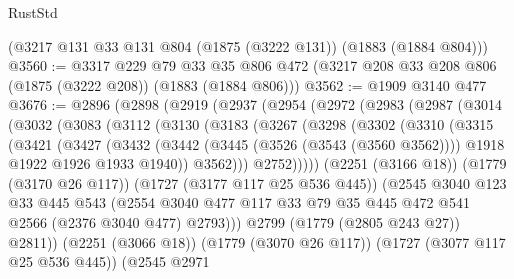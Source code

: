 \begin{lexlean}{RustStd}
\begin{coremodule}
    (@3217 @131 @33 @131 @804 (@1875 (@3222 @131)) (@1883 (@1884 @804)))
@3560 := @3317
    @229
    @79
    @33
    @35
    @806
    @472
    (@3217 @208 @33 @208 @806 (@1875 (@3222 @208)) (@1883 (@1884 @806)))
@3562 := @1909 @3140 @477
@3676 := @2896
    (@2898
      (@2919
        (@2937
          (@2954
            (@2972
              (@2983
                (@2987
                  (@3014
                    (@3032
                      (@3083
                        (@3112
                          (@3130
                            (@3183
                              (@3267
                                (@3298
                                  (@3302
                                    (@3310
                                      (@3315
                                        (@3421
                                          (@3427
                                            (@3432
                                              (@3442
                                                (@3445 (@3526 (@3543 (@3560 @3562))))
                                                @1918
                                                @1922
                                                @1926
                                                @1933
                                                @1940))
                                            @3562)))
                                      @2752)))))
                            (@2251 (@3166 @18))
                            (@1779 (@3170 @26 @117))
                            (@1727 (@3177 @117 @25 @536 @445))
                            (@2545
                              @3040
                              @123
                              @33
                              @445
                              @543
                              (@2554
                                @3040
                                @477
                                @117
                                @33
                                @79
                                @35
                                @445
                                @472
                                @541
                                @2566
                                (@2376 @3040 @477)
                                @2793)))
                          @2799
                          (@1779 (@2805 @243 @27))
                          @2811))
                      (@2251 (@3066 @18))
                      (@1779 (@3070 @26 @117))
                      (@1727 (@3077 @117 @25 @536 @445))
                      (@2545
                        @2971

\end{coremodule}
\end{lexlean}
